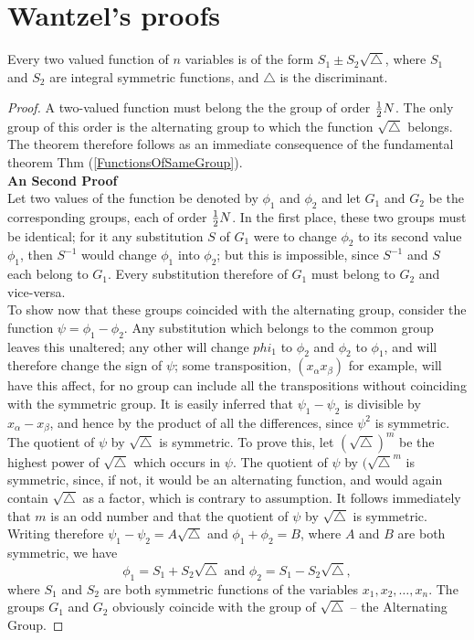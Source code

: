 \section{Wantzel's proofs}

\begin{theorem}
Every two valued function of $n$ variables is of the form $S_1 \pm S_2\sqrt{\triangle}$, where $S_1$ and $S_2$ are integral symmetric functions, and $\triangle$ is the discriminant.
\end{theorem}

\begin{proof}
A two-valued function must belong the the group of order ${1\over 2} N$. The only group of this order is the alternating group to which the function $\sqrt{\triangle}$ belongs. The theorem therefore 
follows as an immediate consequence of the fundamental theorem Thm (\ref{FunctionsOfSameGroup}). \\

{\bf An Second Proof}\\
Let two values of the function be denoted by $\phi_1$ and $\phi_2$ and let $G_1$ and $G_2$ be the corresponding groups, each of order ${1\over 2} N$. In the first place, these two groups must
be identical; for it any substitution $S$ of $G_1$ were to change $\phi_2$ to its second value $\phi_1$, then $S^{-1}$ would change $\phi_1$ into $\phi_2$; but this is impossible, since $S^{-1}$ and $S$ each belong to $G_1$. Every substitution therefore of $G_1$ must belong to $G_2$ and vice-versa. \\

To show now that these groups coincided with the alternating group, consider the function $\psi = \phi_1 - \phi_2$. Any substitution which belongs to the common group leaves this unaltered; any other will change $phi_1$ to $\phi_2$ and $\phi_2$ to $\phi_1$, and will therefore change the sign of $\psi$; some transposition, $(x_\alpha x_\beta)$ for example, will have this affect, for no group can include all the transpositions without coinciding with the symmetric group. It is easily inferred that $\psi_1 - \psi_2$ is divisible by $x_\alpha - x_\beta$, and hence by the product of all the differences, since $\psi^2$ is symmetric. \\

The quotient of $\psi$ by $\sqrt{\triangle}$ is symmetric. To prove this, let $(\sqrt{\triangle})^m$ be the highest power of $\sqrt{\triangle}$ which occurs in $\psi$. The quotient of $\psi$ by
$(\sqrt{\triangle}^m$ is symmetric, since, if not, it would be an alternating function, and would again contain $\sqrt{\triangle}$ as a factor, which is contrary to assumption. It follows immediately that $m$ is an odd number and that the quotient of $\psi$ by $\sqrt{\triangle}$ is symmetric. Writing therefore $\psi_1 - \psi_2 = A\sqrt{\triangle}$ and $\phi_1 + \phi_2 = B$, where $A$ and $B$ are both symmetric, we have 
\[ \phi_1 = S_1 + S_2\sqrt{\triangle} \mbox{  and  } \phi_2 = S_1 - S_2\sqrt{\triangle},\] where $S_1$ and $S_2$ are both symmetric functions of the variables $x_1, x_2, \hdots, x_n$. The groups $G_1$ and $G_2$ obviously coincide with the group of $\sqrt{\triangle}$ -- the Alternating Group. 
\end{proof}

